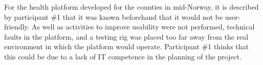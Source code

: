 
For the health platform developed for the counties in mid-Norway, it is described by participant \#1 that it was known beforehand that it would not be user-friendly. As well as activities to improve usability were not performed, technical faults in the platform, and a testing rig was placed too far away from the real environment in which the platform would operate. Participant \#1 thinks that this could be due to a lack of IT competence in the planning of the project.






